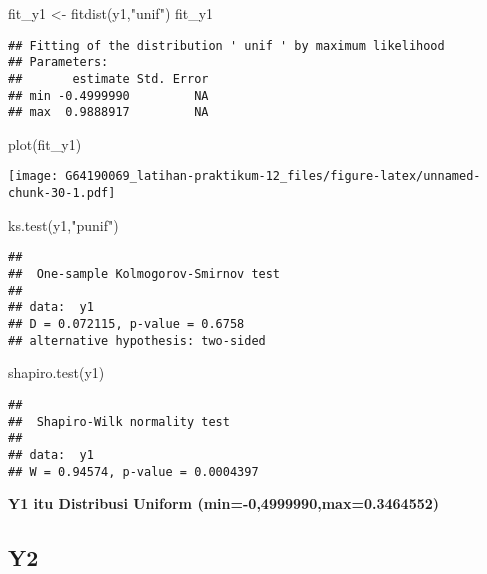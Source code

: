 \documentclass[
]{article}
\newenvironment{Shaded}{\begin{snugshade}}{\end{snugshade}}
\newcommand{\FunctionTok}[1]{\textcolor[rgb]{0.00,0.00,0.00}{#1}}
\newcommand{\NormalTok}[1]{#1}
\newcommand{\OtherTok}[1]{\textcolor[rgb]{0.56,0.35,0.01}{#1}}
\newcommand{\StringTok}[1]{\textcolor[rgb]{0.31,0.60,0.02}{#1}}
\begin{document}
\begin{Shaded}
\begin{Highlighting}[]
\NormalTok{fit\_y1 }\OtherTok{\textless{}{-}} \FunctionTok{fitdist}\NormalTok{(y1,}\StringTok{"unif"}\NormalTok{)}
\NormalTok{fit\_y1}
\end{Highlighting}
\end{Shaded}

\begin{verbatim}
## Fitting of the distribution ' unif ' by maximum likelihood 
## Parameters:
##       estimate Std. Error
## min -0.4999990         NA
## max  0.9888917         NA
\end{verbatim}

\begin{Shaded}
\begin{Highlighting}[]
\FunctionTok{plot}\NormalTok{(fit\_y1)}
\end{Highlighting}
\end{Shaded}

\texttt{[image: G64190069\_latihan-praktikum-12\_files/figure-latex/unnamed-chunk-30-1.pdf]}

\begin{Shaded}
\begin{Highlighting}[]
\FunctionTok{ks.test}\NormalTok{(y1,}\StringTok{"punif"}\NormalTok{)}
\end{Highlighting}
\end{Shaded}

\begin{verbatim}
## 
##  One-sample Kolmogorov-Smirnov test
## 
## data:  y1
## D = 0.072115, p-value = 0.6758
## alternative hypothesis: two-sided
\end{verbatim}

\begin{Shaded}
\begin{Highlighting}[]
\FunctionTok{shapiro.test}\NormalTok{(y1)}
\end{Highlighting}
\end{Shaded}

\begin{verbatim}
## 
##  Shapiro-Wilk normality test
## 
## data:  y1
## W = 0.94574, p-value = 0.0004397
\end{verbatim}

\textbf{Y1 itu Distribusi Uniform (min=-0,4999990,max=0.3464552)}

\hypertarget{y2-2}{%
\subsection{Y2}\label{y2-2}}
\end{document}
